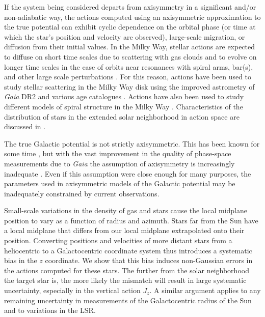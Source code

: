 \documentclass[twocolumn]{aastex62}
\begin{document}
If the system being considered departs from axisymmetry in a significant and/or
non-adiabatic way, the actions computed using an axisymmetric approximation to
the true potential can exhibit cyclic dependence on the orbital phase (or time
at which the star's position and velocity are observed), large-scale migration,
or diffusion from their initial values. In the Milky Way, stellar actions are
expected to diffuse on short time scales due to scattering with gas clouds and
to evolve on longer time scales in the case of orbits near resonances with
spiral arms, bar(s), and other large scale perturbations
\citep{2014RvMP...86....1S}. For this reason, actions have been used to study
stellar scattering in the Milky Way disk using the improved astrometry of
\textit{Gaia} DR2 and various age catalogues \citep{2018ApJ...867...31B,
2018arXiv180803278T}. Actions have also been used to study different models of
spiral structure in the Milky Way \citep{2019MNRAS.tmp..155S}. Characteristics
of the distribution of stars in the extended solar neighborhood in action space
are discussed in \citet{2019MNRAS.484.3291T}.

The true Galactic potential is not strictly axisymmetric. This has been known
for some time \citep[e.g.,][]{1957AJ.....62...93K,2009MNRAS.396L..56M,
2012ApJ...750L..41W}, but with the vast improvement in the quality of
phase-space measurements due to \textit{Gaia} the assumption of axisymmetry
is increasingly inadequate \citep[e.g.,][]{2018Natur.561..360A, 2019MNRAS.485.3134L}. Even if
this assumption were close enough for many purposes, the parameters used in
axisymmetric models of the Galactic potential may be inadequately constrained by
current observations.

Small-scale variations in the density of gas and stars cause the
local midplane position to vary as a
function of radius and azimuth. 
Stars far from the Sun have a local midplane that differs
from our local midplane extrapolated onto their position. Converting
positions and velocities of more distant stars from a 
heliocentric to a Galactocentric coordinate system thus introduces a systematic
bias in the $z$ coordinate. We show that this bias induces non-Gaussian errors
in the actions computed for these stars. The further from the solar neighborhood
the target star is, the more likely the mismatch will result in large systematic
uncertainty, especially in the vertical action $J_z$. A similar argument applies
to any remaining uncertainty in measurements of the Galactocentric radius of the
Sun and to variations in the LSR.
\end{document}
